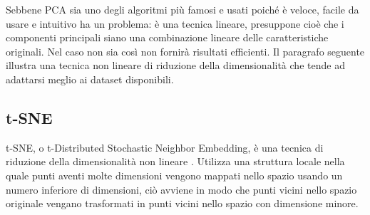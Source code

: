 \documentclass[12pt,italian]{report}
\begin{document}
Sebbene PCA sia uno degli algoritmi più famosi e usati poiché è veloce, facile da usare e intuitivo ha un problema: è una tecnica lineare, presuppone cioè che i componenti principali siano una combinazione lineare delle caratteristiche originali. Nel caso non sia così non fornirà risultati efficienti. 
Il paragrafo seguente illustra una tecnica non lineare di riduzione della dimensionalità che tende ad adattarsi meglio ai dataset disponibili.
\subsection{t-SNE}
t-SNE, o t-Distributed Stochastic Neighbor Embedding, è una tecnica di riduzione della dimensionalità non lineare \cite{t-SNE}. Utilizza una struttura locale nella quale punti aventi molte dimensioni vengono mappati nello spazio usando un numero inferiore di dimensioni, ciò avviene in modo che punti vicini nello spazio originale vengano trasformati in punti vicini nello spazio con dimensione minore.
 
\end{document}
